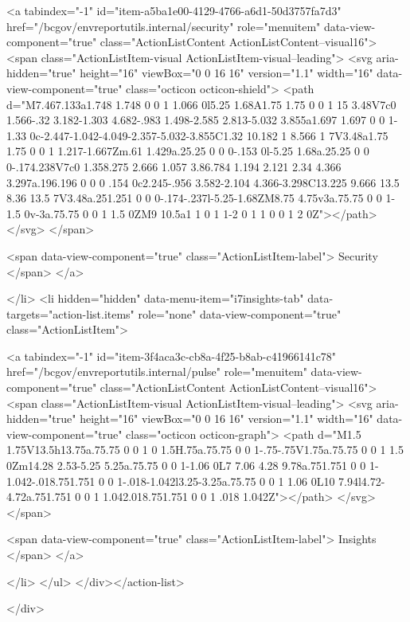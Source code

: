     
    <a tabindex="-1" id="item-a5ba1e00-4129-4766-a6d1-50d3757fa7d3" href="/bcgov/envreportutils.internal/security" role="menuitem" data-view-component="true" class="ActionListContent ActionListContent--visual16">
        <span class="ActionListItem-visual ActionListItem-visual--leading">
          <svg aria-hidden="true" height="16" viewBox="0 0 16 16" version="1.1" width="16" data-view-component="true" class="octicon octicon-shield">
    <path d="M7.467.133a1.748 1.748 0 0 1 1.066 0l5.25 1.68A1.75 1.75 0 0 1 15 3.48V7c0 1.566-.32 3.182-1.303 4.682-.983 1.498-2.585 2.813-5.032 3.855a1.697 1.697 0 0 1-1.33 0c-2.447-1.042-4.049-2.357-5.032-3.855C1.32 10.182 1 8.566 1 7V3.48a1.75 1.75 0 0 1 1.217-1.667Zm.61 1.429a.25.25 0 0 0-.153 0l-5.25 1.68a.25.25 0 0 0-.174.238V7c0 1.358.275 2.666 1.057 3.86.784 1.194 2.121 2.34 4.366 3.297a.196.196 0 0 0 .154 0c2.245-.956 3.582-2.104 4.366-3.298C13.225 9.666 13.5 8.36 13.5 7V3.48a.251.251 0 0 0-.174-.237l-5.25-1.68ZM8.75 4.75v3a.75.75 0 0 1-1.5 0v-3a.75.75 0 0 1 1.5 0ZM9 10.5a1 1 0 1 1-2 0 1 1 0 0 1 2 0Z"></path>
</svg>
        </span>
      
        <span data-view-component="true" class="ActionListItem-label">
          Security
</span>      
</a>
  
</li>
        <li hidden="hidden" data-menu-item="i7insights-tab" data-targets="action-list.items" role="none" data-view-component="true" class="ActionListItem">
    
    
    <a tabindex="-1" id="item-3f4aca3c-cb8a-4f25-b8ab-c41966141c78" href="/bcgov/envreportutils.internal/pulse" role="menuitem" data-view-component="true" class="ActionListContent ActionListContent--visual16">
        <span class="ActionListItem-visual ActionListItem-visual--leading">
          <svg aria-hidden="true" height="16" viewBox="0 0 16 16" version="1.1" width="16" data-view-component="true" class="octicon octicon-graph">
    <path d="M1.5 1.75V13.5h13.75a.75.75 0 0 1 0 1.5H.75a.75.75 0 0 1-.75-.75V1.75a.75.75 0 0 1 1.5 0Zm14.28 2.53-5.25 5.25a.75.75 0 0 1-1.06 0L7 7.06 4.28 9.78a.751.751 0 0 1-1.042-.018.751.751 0 0 1-.018-1.042l3.25-3.25a.75.75 0 0 1 1.06 0L10 7.94l4.72-4.72a.751.751 0 0 1 1.042.018.751.751 0 0 1 .018 1.042Z"></path>
</svg>
        </span>
      
        <span data-view-component="true" class="ActionListItem-label">
          Insights
</span>      
</a>
  
</li>
</ul>    
</div></action-list>


</div>
      
